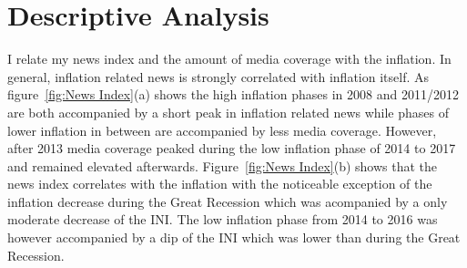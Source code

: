 \documentclass[review]{elsarticle}
\begin{document}
\section{Descriptive Analysis} \label{sec:Descriptive Analysis}

I relate my news index and the amount of media coverage with the inflation. In general, inflation related news is strongly correlated with inflation itself. As figure~\ref{fig:News Index}(a) shows the high inflation phases in 2008 and 2011/2012 are both accompanied by a short peak in inflation related news while phases of lower inflation in between are accompanied by less media coverage. However, after 2013 media coverage peaked during the low inflation phase of 2014 to 2017 and remained elevated afterwards. Figure~\ref{fig:News Index}(b) shows that the news index correlates with the inflation with the noticeable exception of the inflation decrease during the Great Recession which was acompanied by a only moderate decrease of the INI. The low inflation phase from 2014 to 2016 was however accompanied by a dip of the INI which was lower than during the Great Recession. 
\\
\end{document}
